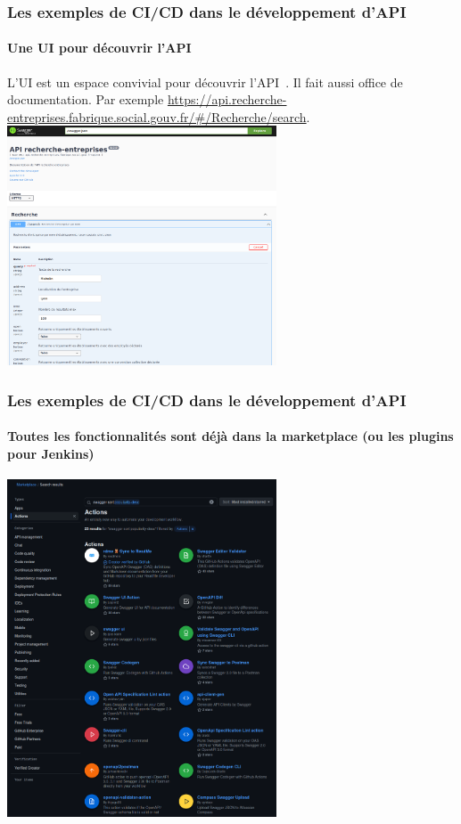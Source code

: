 \documentclass{beamer}
\begin{document}
    \begin{frame}
        \frametitle{Les exemples de CI/CD dans le développement d'API}
        \framesubtitle{Une UI pour découvrir l'API}
        \transdissolve
        L'UI est un espace convivial pour découvrir l'API~.
        Il fait aussi office de documentation.
        Par exemple \url{https://api.recherche-entreprises.fabrique.social.gouv.fr/\#/Recherche/search}.
        \bigbreak
        \centering
        \includegraphics[width=8cm]{image/swagger-ui.png}
    \end{frame}

    \begin{frame}
        \frametitle{Les exemples de CI/CD dans le développement d'API}
        \framesubtitle{Toutes les fonctionnalités sont déjà dans la marketplace (ou les plugins pour Jenkins)}
        \transdissolve
        \centering
        \includegraphics[width=8cm]{image/swagger-worflows.png}
    \end{frame}
\end{document}
